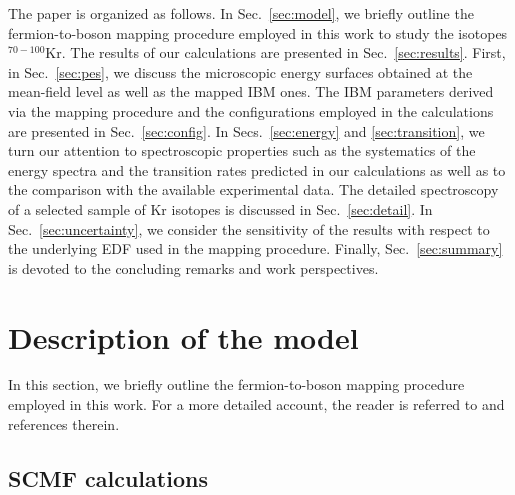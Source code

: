 \documentclass[twocolumn,showpacs,amsmath,amssymb,superscriptaddress]{revtex4-1}
\begin{document}
The paper is organized as follows. In Sec.~\ref{sec:model}, we briefly 
outline the fermion-to-boson mapping procedure employed in this work to 
study the isotopes $^{70-100}$Kr. The results of our calculations are 
presented in Sec.~\ref{sec:results}. First, in Sec.~\ref{sec:pes}, we 
discuss the  microscopic energy surfaces obtained at the mean-field 
level as well as the mapped IBM ones. The IBM parameters derived via 
the mapping procedure and the configurations employed in the 
calculations are presented in Sec.~\ref{sec:config}. In 
Secs.~\ref{sec:energy} and \ref{sec:transition}, we turn our attention 
to spectroscopic properties such as the systematics of the energy 
spectra and the transition rates predicted in our calculations as well 
as to the comparison with the available experimental data. The detailed 
spectroscopy of a selected sample of Kr isotopes is discussed in 
Sec.~\ref{sec:detail}. In Sec.~\ref{sec:uncertainty}, we consider the 
sensitivity of the results with respect to the underlying EDF used in 
the mapping procedure. Finally, Sec.~\ref{sec:summary} is devoted to 
the concluding remarks and work perspectives.




\section{Description of the model\label{sec:model}}



In this section, we briefly outline the fermion-to-boson mapping
procedure employed in this work. For a more detailed account, the
reader is referred to \cite{nomura2016zr,nomura2017ge} and references  
therein. 




\subsection{SCMF calculations}

\end{document}
